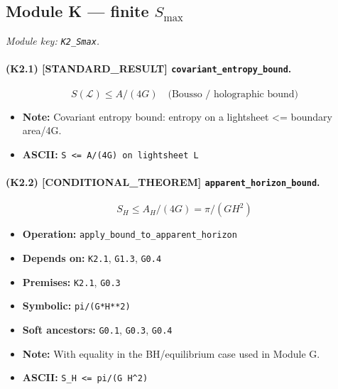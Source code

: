 \documentclass[11pt,a4paper]{article}
\theoremstyle{remark}\newtheorem*{caution}{Caution}
\newcommand{\tagbox}[1]{\textsc{[#1]}}
\begin{document}
\subsection{Module K --- finite $S_{\max}$}
\textit{Module key: \texttt{K2\_Smax}.}
\paragraph{(K2.1) \tagbox{STANDARD\_RESULT} \texttt{covariant\_entropy\_bound}.}
\begin{equation}
S(\mathcal{L})\le A/(4G)\quad\text{(Bousso / holographic bound)}
\tag{K2.1}
\end{equation}
\begin{itemize}\setlength{\itemsep}{0.12em}
\item \textbf{Note:} Covariant entropy bound: entropy on a lightsheet <= boundary area/4G.
\item \textbf{ASCII:} \texttt{S <= A/(4G) on lightsheet L}
\end{itemize}
\paragraph{(K2.2) \tagbox{CONDITIONAL\_THEOREM} \texttt{apparent\_horizon\_bound}.}
\begin{equation}
S_H\le A_H/(4G)=\pi/(G H^2)
\tag{K2.2}
\end{equation}
\begin{itemize}\setlength{\itemsep}{0.12em}
\item \textbf{Operation:} \texttt{apply\_bound\_to\_apparent\_horizon}
\item \textbf{Depends on:} \texttt{K2.1}, \texttt{G1.3}, \texttt{G0.4}
\item \textbf{Premises:} \texttt{K2.1}, \texttt{G0.3}
\item \textbf{Symbolic:} \texttt{pi/(G*H**2)}
\item \textbf{Soft ancestors:} \texttt{G0.1}, \texttt{G0.3}, \texttt{G0.4}
\item \textbf{Note:} With equality in the BH/equilibrium case used in Module G.
\item \textbf{ASCII:} \texttt{S\_H <= pi/(G H^2)}
\end{itemize}
\end{document}
